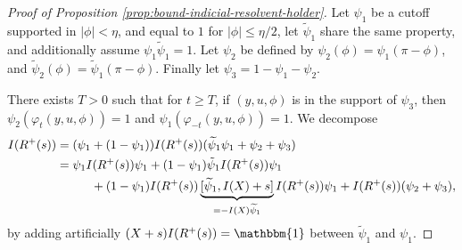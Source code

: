 \documentclass[JEP,XML,SOM,Unicode,NoFloatCountersInSection]{cedram}
\theoremstyle{plain}
\theoremstyle{definition}
\begin{document}
\begin{proof}[Proof of Proposition \ref{prop:bound-indicial-resolvent-holder}]
Let $\psi_1$ be a cutoff supported in $|\phi|< \eta$, and equal to $1$ for $|\phi|\leq \eta/2$, let $\tilde{\psi}_1$ share the same property, and additionally assume $\psi_1\tilde{\psi}_1=1$. Let $\psi_2$ be defined by $\psi_2(\phi)=\psi_1(\pi-\phi)$, and $\tilde{\psi}_2(\phi)=\tilde{\psi}_1(\pi-\phi)$. Finally let $\psi_3=1-\psi_1-\psi_2$.

There exists $T>0$ such that for $t\geq T$, if $(y,u,\phi)$ is in the support of $\psi_3$, then $\psi_2(\varphi_t(y,u,\phi))=1$ and $\psi_1(\varphi_{-t}(y,u,\phi)) = 1$. We decompose\vspace*{-3pt}
\[
\begin{split}
I(R^+(s)) &= (\psi_1 + (1-\psi_1))I(R^+(s)) (\widetilde{\psi}_1\psi_1+\psi_2+\psi_3) \\
& = \psi_1 I(R^+(s))\psi_1 + (1-\psi_1)\tilde{\psi}_1 I(R^+(s)) \psi_1 \\
&\hspace*{1cm} + (1-\psi_1) I(R^+(s)) \underbrace{[\widetilde{\psi}_1, I(X)+s]}_{=-I(X) \widetilde{\psi}_1} I(R^+(s))\psi_1 + I(R^+(s)) (\psi_2+\psi_3),
\end{split}
\]
by adding artificially $(X+s)I(R^+(s))=\mathbbm{1}$ between $\widetilde{\psi}_1$ and $\psi_1$.


\end{proof}
\end{document}

